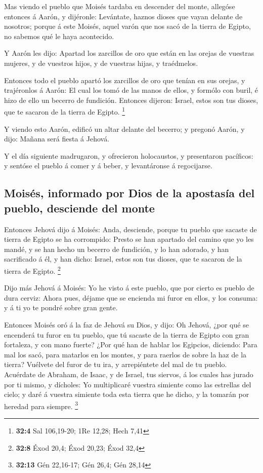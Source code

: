  Mas viendo el pueblo que Moisés tardaba en descender del
monte, allegóse entonces á Aarón, y dijéronle: Levántate, haznos dioses
que vayan delante de nosotros; porque á este Moisés, aquel varón que nos
sacó de la tierra de Egipto, no sabemos qué le haya acontecido.

 Y Aarón les dijo: Apartad los zarcillos de oro que están
en las orejas de vuestras mujeres, y de vuestros hijos, y de vuestras
hijas, y traédmelos.

 Entonces todo el pueblo apartó los zarcillos de oro que
tenían en sus orejas, y trajéronlos á Aarón:  El cual los
tomó de las manos de ellos, y formólo con buril, é hizo de ello un
becerro de fundición. Entonces dijeron: Israel, estos son tus dioses,
que te sacaron de la tierra de Egipto. \footnote{\textbf{32:4} Sal
  106,19-20; 1Re 12,28; Hech 7,41}

 Y viendo esto Aarón, edificó un altar delante del
becerro; y pregonó Aarón, y dijo: Mañana será fiesta á Jehová.

 Y el día siguiente madrugaron, y ofrecieron holocaustos,
y presentaron pacíficos: y sentóse el pueblo á comer y á beber, y
levantáronse á regocijarse.

\hypertarget{moisuxe9s-informado-por-dios-de-la-apostasuxeda-del-pueblo-desciende-del-monte}{%
\subsection{Moisés, informado por Dios de la apostasía del pueblo,
desciende del
monte}\label{moisuxe9s-informado-por-dios-de-la-apostasuxeda-del-pueblo-desciende-del-monte}}

 Entonces Jehová dijo á Moisés: Anda, desciende, porque tu
pueblo que sacaste de tierra de Egipto se ha corrompido: 
Presto se han apartado del camino que yo les mandé, y se han hecho un
becerro de fundición, y lo han adorado, y han sacrificado á él, y han
dicho: Israel, estos son tus dioses, que te sacaron de la tierra de
Egipto. \footnote{\textbf{32:8} Éxod 20,4; Éxod 20,23; Éxod 32,4}

 Dijo más Jehová á Moisés: Yo he visto á este pueblo, que
por cierto es pueblo de dura cerviz:  Ahora pues, déjame
que se encienda mi furor en ellos, y los consuma: y á ti yo te pondré
sobre gran gente.

 Entonces Moisés oró á la faz de Jehová su Dios, y dijo:
Oh Jehová, ¿por qué se encenderá tu furor en tu pueblo, que tú sacaste
de la tierra de Egipto con gran fortaleza, y con mano fuerte?
 ¿Por qué han de hablar los Egipcios, diciendo: Para mal
los sacó, para matarlos en los montes, y para raerlos de sobre la haz de
la tierra? Vuélvete del furor de tu ira, y arrepiéntete del mal de tu
pueblo.  Acuérdate de Abraham, de Isaac, y de Israel, tus
siervos, á los cuales has jurado por ti mismo, y dícholes: Yo
multiplicaré vuestra simiente como las estrellas del cielo; y daré á
vuestra simiente toda esta tierra que he dicho, y la tomarán por heredad
para siempre. \footnote{\textbf{32:13} Gén 22,16-17; Gén 26,4; Gén 28,14}


